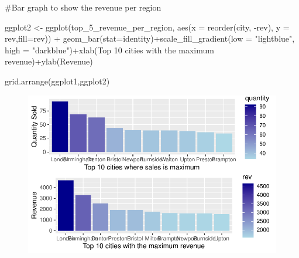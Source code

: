 \documentclass[
  letterpaper,
  DIV=11,
  numbers=noendperiod]{scrartcl}
\newenvironment{Shaded}{\begin{snugshade}}{\end{snugshade}}
\newcommand{\AttributeTok}[1]{\textcolor[rgb]{0.40,0.45,0.13}{#1}}
\newcommand{\CommentTok}[1]{\textcolor[rgb]{0.37,0.37,0.37}{#1}}
\newcommand{\FunctionTok}[1]{\textcolor[rgb]{0.28,0.35,0.67}{#1}}
\newcommand{\NormalTok}[1]{\textcolor[rgb]{0.00,0.23,0.31}{#1}}
\newcommand{\OtherTok}[1]{\textcolor[rgb]{0.00,0.23,0.31}{#1}}
\newcommand{\SpecialCharTok}[1]{\textcolor[rgb]{0.37,0.37,0.37}{#1}}
\newcommand{\StringTok}[1]{\textcolor[rgb]{0.13,0.47,0.30}{#1}}
\begin{document}
\begin{Shaded}
\begin{Highlighting}[]
\CommentTok{\#Bar graph to show the revenue per region}

\NormalTok{ggplot2 }\OtherTok{\textless{}{-}} \FunctionTok{ggplot}\NormalTok{(top\_5\_revenue\_per\_region, }\FunctionTok{aes}\NormalTok{(}\AttributeTok{x =} \FunctionTok{reorder}\NormalTok{(city, }\SpecialCharTok{{-}}\NormalTok{rev), }\AttributeTok{y =}\NormalTok{ rev,}\AttributeTok{fill=}\NormalTok{rev)) }\SpecialCharTok{+}  \FunctionTok{geom\_bar}\NormalTok{(}\AttributeTok{stat=}\StringTok{\textquotesingle{}identity\textquotesingle{}}\NormalTok{)}\SpecialCharTok{+}\FunctionTok{scale\_fill\_gradient}\NormalTok{(}\AttributeTok{low =} \StringTok{"lightblue"}\NormalTok{, }\AttributeTok{high =} \StringTok{"darkblue"}\NormalTok{)}\SpecialCharTok{+}\FunctionTok{xlab}\NormalTok{(}\StringTok{\textquotesingle{}Top 10 cities with the maximum revenue\textquotesingle{}}\NormalTok{)}\SpecialCharTok{+}\FunctionTok{ylab}\NormalTok{(}\StringTok{\textquotesingle{}Revenue\textquotesingle{}}\NormalTok{)}

\FunctionTok{grid.arrange}\NormalTok{(ggplot1,ggplot2)}
\end{Highlighting}
\end{Shaded}

\begin{figure}[H]

{\centering \includegraphics{Report_files/figure-pdf/unnamed-chunk-28-1.pdf}

}

\end{figure}
\end{document}
